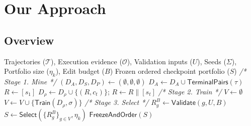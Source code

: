 \documentclass[10pt,conference]{IEEEtran}
\begin{document}
\section{Our Approach}
\label{sec:approach}

\subsection{Overview}

\begin{algorithm}[h]
\caption{\textsc{ZPDPatch}}
\label{alg:construct}
\footnotesize
\begin{algorithmic}[1]
\Require Trajectories ($\mathcal T$), Execution evidence ($\mathcal O$), Validation inputs ($U$), Seeds ($\Sigma$), Portfolio size ($\eta_k$), Edit budget ($B$)
\Ensure Frozen ordered checkpoint portfolio ($S$)
 \Statex\hspace{\algorithmicindent}\textit{/* Stage 1. Mine */}
\State $(D_A,D_S,D_P)\gets(\emptyset,\emptyset,\emptyset)$
 \State $D_A\gets D_A\cup\mathsf{TerminalPairs}(\tau)$ 
  \State $R\gets[s_1]$ 
    \State $D_\rho\gets D_\rho\cup\{(R,c_t)\}$; $R\gets R\mathbin{\|}[s_t]$
   \EndIf
  \EndFor
 \EndFor
\EndFor
 \Statex\hspace{\algorithmicindent}\textit{/* Stage 2. Train */}
\State $V\gets\emptyset$
 \State $V\gets V\cup\{\mathsf{Train}(D_\rho,\sigma)\}$
\EndFor
 \Statex\hspace{\algorithmicindent}\textit{/* Stage 3. Select */}
 \State $R_g^B\gets\mathsf{Validate}(g,U,B)$ 
\EndFor
\State $S\gets\mathsf{Select}(\{R_g^B\}_{g\in V},\eta_k)$ 
\State \Return $\mathsf{FreezeAndOrder}(S)$
\EndProcedure
\end{algorithmic}
\end{algorithm}
\end{document}
